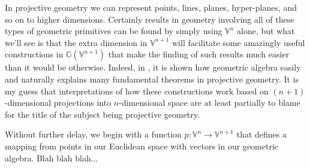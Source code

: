 \documentclass[12pt]{article}
\newcommand{\G}{\mathbb{G}}
\newcommand{\V}{\mathbb{V}}
\begin{document}
In projective geometry we can represent points, lines, planes, hyper-planes, and so on to higher dimensions.
Certainly results in geometry involving all of these types of geometric 
primitives can be found by simply using $\V^n$ alone, but what we'll see is that the extra dimension
in $\V^{n+1}$ will facilitate some amazingly useful constructions in $\G(\V^{n+1})$ that
make the finding of such results much easier than it would be otherwise.  Indeed, in
\cite{hestenes91}, it is shown how geometric algebra easily and naturally explains many
fundamental theorems in projective geometry.
It is my guess that interpretations of how these constructions work based on $(n+1)$-dimensional
projections into $n$-dimensional space are at least partially to blame for the title of the
subject being projective geometry.

Without further delay, we begin with a function $p:\V^n\to\V^{n+1}$ that defines
a mapping from points in our Euclidean space with vectors in our geometric algebra.
Blah blah blah...



\end{document}
